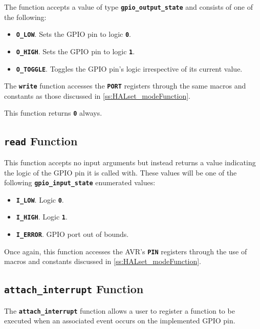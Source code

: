 \documentclass[a4paper, oneside, 11pt, titlepage, onecolumn, openright]{report}
\begin{document}
			The function accepts a value of type \textbf{\texttt{gpio\_output\_state}} and consists of one of the following:
			
\begin{itemize}
\item \textbf{\texttt{O\_LOW}}. Sets the GPIO pin to logic \textbf{\texttt{0}}.
\item \textbf{\texttt{O\_HIGH}}. Sets the GPIO pin to logic \textbf{\texttt{1}}.
\item \textbf{\texttt{O\_TOGGLE}}. Toggles the GPIO pin's logic irrespective of its current value.
\end{itemize}

The \textbf{\texttt{write}} function accesses the \textbf{\texttt{PORT}} registers through the same macros and constants as those discussed in \ref{ss:HALset_modeFunction}.

This function returns \textbf{\texttt{0}} always.

\subsection{\textbf{\texttt{read}} Function}
			\label{ss:HALreadFunction}
			
			This function accepts no input arguments but instead returns a value indicating the logic of the GPIO pin it is called with. These values will be one of the following \textbf{\texttt{gpio\_input\_state}} enumerated values:
			
\begin{itemize}
\item \textbf{\texttt{I\_LOW}}. Logic \textbf{\texttt{0}}.
\item \textbf{\texttt{I\_HIGH}}. Logic \textbf{\texttt{1}}.
\item \textbf{\texttt{I\_ERROR}}. GPIO port out of bounds.
\end{itemize}

			Once again, this function accesses the AVR's \textbf{\texttt{PIN}} registers through the use of macros and constants discussed in \ref{ss:HALset_modeFunction}.
			
\subsection{\textbf{\texttt{attach\_interrupt}} Function}
			\label{ss:HALattach_interruptFunction}
			
			The \textbf{\texttt{attach\_interrupt}} function allows a user to register a function to be executed when an associated event occurs on the implemented GPIO pin.
			
\end{document}
